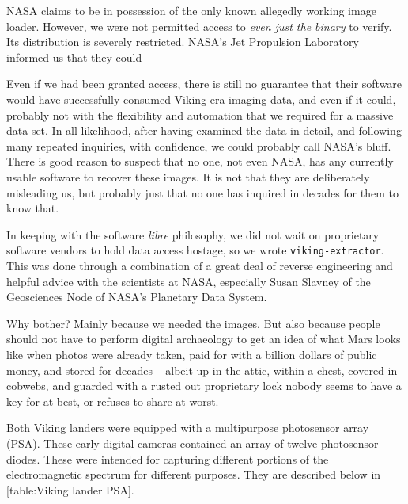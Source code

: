 NASA claims to be in possession of the only known allegedly working image loader. However, we were not permitted access to {\it even just the binary} to verify. Its distribution is severely restricted. NASA's Jet Propulsion Laboratory informed us that they could 

Even if we had been granted access, there is still no guarantee that their software would have successfully consumed Viking era imaging data, and even if it could, probably not with the flexibility and automation that we required for a massive data set. In all likelihood, after having examined the data in detail, and following many repeated inquiries, with confidence, we could probably call NASA's bluff. There is good reason to suspect that no one, not even NASA, has any currently usable software to recover these images. It is not that they are deliberately misleading us, but probably just that no one has inquired in decades for them to know that.


In keeping with the software {\it libre} philosophy, we did not wait on proprietary software vendors to hold data access hostage, so we wrote {\tt viking-extractor}. This was done through a combination of a great deal of reverse engineering and helpful advice with the scientists at NASA, especially Susan Slavney of the Geosciences Node of NASA's Planetary Data System. 

Why bother? Mainly because we needed the images. But also because people should not have to perform digital archaeology to get an idea of what Mars looks like when photos were already taken, paid for with a billion dollars of public money, and stored for decades -- albeit up in the attic, within a chest, covered in cobwebs, and guarded with a rusted out proprietary lock nobody seems to have a key for at best, or refuses to share at worst.

    {}

Both Viking landers were equipped with a multipurpose photosensor array (PSA). These early digital cameras contained an array of twelve photosensor diodes. These were intended for capturing different portions of the electromagnetic spectrum for different purposes. They are described below in [table:Viking lander PSA].

